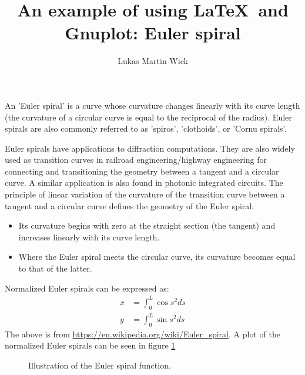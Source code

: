 \documentclass[twocolumn]{article}
\title{An example of using \LaTeX \ and Gnuplot: Euler spiral}
\author{Lukas Martin Wick}
\begin{document}
\maketitle

An 'Euler spiral' is a curve whose curvature changes linearly with its curve length 
(the curvature of a circular curve is equal to the reciprocal of the radius). 
Euler spirals are also commonly referred to as 'spiros', 'clothoids', or 'Cornu spirals'.

Euler spirals have applications to diffraction computations. They are also widely used as transition curves in railroad engineering/highway engineering
for connecting and transitioning the geometry between a tangent and a circular curve. 
A similar application is also found in photonic integrated circuits. The principle of linear 
variation of the curvature of the transition curve between a tangent and a circular curve defines the geometry of the Euler spiral: 

\begin{itemize}
    \item Its curvature begins with zero at the straight section (the tangent) and increases linearly with its curve length.
    \item Where the Euler spiral meets the circular curve, its curvature becomes equal to that of the latter.
\end{itemize}

Normalized Euler spirals can be expressed as:
\begin{align}
    x &= \int_0^L \cos s^2 ds \\
    y &= \int_0^L \sin s^2 ds
\end{align}
The above is from \url{https://en.wikipedia.org/wiki/Euler_spiral}.
A plot of the normalized Euler spirals can be seen in figure \ref{fig:eulerSpirals}
\begin{figure}[]
    \centering

\caption{Illustration of the Euler spiral function.}
\label{fig:eulerSpirals}
\end{figure}
\end{document}
